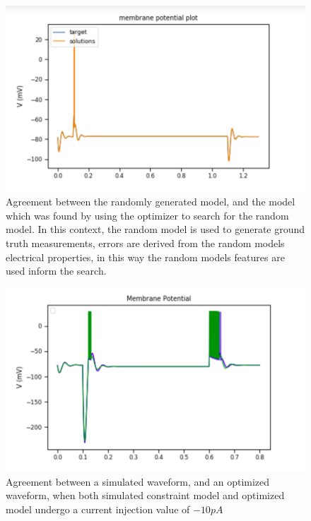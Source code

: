 \begin{figure}
    \centering
    \includegraphics[scale=0.85]{figures/simulated_data_supra_threshold.png}
    \caption{Agreement between the randomly generated model, and the model which was found by using the optimizer to search for the random model. In this context, the random model is used to generate ground truth measurements, errors are derived from the random models electrical properties, in this way the random models features are used inform the search.}
    \label{fig:my_label}
\end{figure}
\begin{figure}
    \centering
    \includegraphics[scale=0.85]{figures/simulated_data_sub_threshold.png}
    \caption{Agreement between a simulated waveform, and an optimized waveform, when both simulated constraint model and optimized model undergo a current injection value of $-10pA$}
    \label{fig:adexp_model_rebound_spike}
\end{figure}

